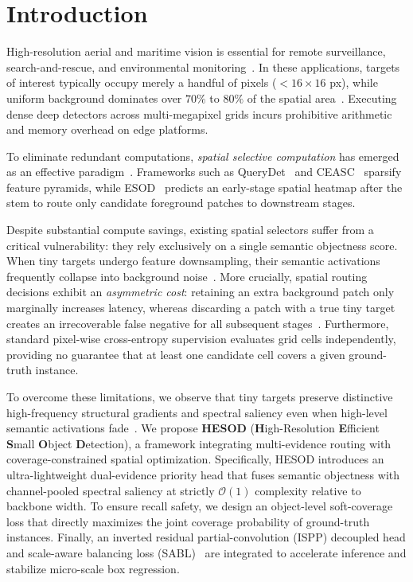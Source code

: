\section{Introduction}
\label{sec:intro}

High-resolution aerial and maritime vision is essential for remote surveillance, search-and-rescue, and environmental monitoring~\cite{VisDrone,UAVDT}. In these applications, targets of interest typically occupy merely a handful of pixels ($<16\times 16$ px), while uniform background dominates over $70\%$ to $80\%$ of the spatial area~\cite{ESOD,TinyPerson}. Executing dense deep detectors across multi-megapixel grids incurs prohibitive arithmetic and memory overhead on edge platforms.

To eliminate redundant computations, \emph{spatial selective computation} has emerged as an effective paradigm~\cite{AutoFocus,QueryDet,CEASC,ESOD}. Frameworks such as QueryDet~\cite{QueryDet} and CEASC~\cite{CEASC} sparsify feature pyramids, while ESOD~\cite{ESOD} predicts an early-stage spatial heatmap after the stem to route only candidate foreground patches to downstream stages.

Despite substantial compute savings, existing spatial selectors suffer from a critical vulnerability: they rely exclusively on a single semantic objectness score. When tiny targets undergo feature downsampling, their semantic activations frequently collapse into background noise~\cite{SET}. More crucially, spatial routing decisions exhibit an \emph{asymmetric cost}: retaining an extra background patch only marginally increases latency, whereas discarding a patch with a true tiny target creates an irrecoverable false negative for all subsequent stages~\cite{ESOD}. Furthermore, standard pixel-wise cross-entropy supervision evaluates grid cells independently, providing no guarantee that at least one candidate cell covers a given ground-truth instance.

To overcome these limitations, we observe that tiny targets preserve distinctive high-frequency structural gradients and spectral saliency even when high-level semantic activations fade~\cite{SET}. We propose \textbf{HESOD} (\textbf{H}igh-Resolution \textbf{E}fficient \textbf{S}mall \textbf{O}bject \textbf{D}etection), a framework integrating multi-evidence routing with coverage-constrained spatial optimization. Specifically, HESOD introduces an ultra-lightweight dual-evidence priority head that fuses semantic objectness with channel-pooled spectral saliency at strictly $\mathcal{O}(1)$ complexity relative to backbone width. To ensure recall safety, we design an object-level soft-coverage loss that directly maximizes the joint coverage probability of ground-truth instances. Finally, an inverted residual partial-convolution (ISPP) decoupled head and scale-aware balancing loss (SABL)~\cite{SSABNet} are integrated to accelerate inference and stabilize micro-scale box regression.

